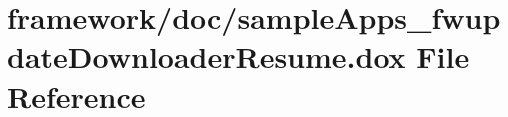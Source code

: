 \hypertarget{sample_apps__fwupdate_downloader_resume_8dox}{}\section{framework/doc/sample\+Apps\+\_\+fwupdate\+Downloader\+Resume.dox File Reference}
\label{sample_apps__fwupdate_downloader_resume_8dox}
